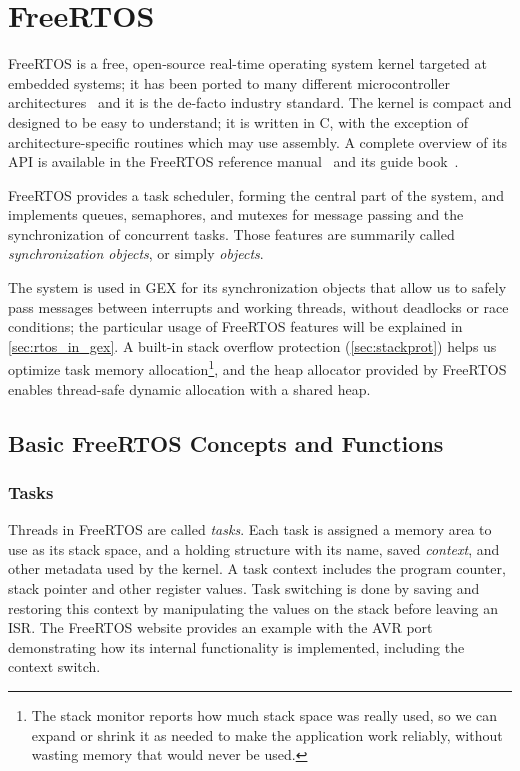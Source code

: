 \chapter{FreeRTOS} \label{sec:freertos}

FreeRTOS is a free, open-source real-time operating system kernel targeted at embedded systems; it has been ported to many different microcontroller architectures~\cite{freertos-ports-list} and it is the de-facto industry standard. The kernel is compact and designed to be easy to understand; it is written in C, with the exception of architecture-specific routines which may use assembly. A complete overview of its \gls{API} is available in the FreeRTOS reference manual~\cite{freertos-rm} and its guide book~\cite{freertos-book}.

FreeRTOS provides a task scheduler, forming the central part of the system, and implements queues, semaphores, and mutexes for message passing and the synchronization of concurrent tasks. Those features are summarily called \textit{synchronization objects}, or simply \textit{objects}.

The system is used in GEX for its synchronization objects that allow us to safely pass messages between interrupts and working threads, without deadlocks or race conditions; the particular usage of FreeRTOS features will be explained in \cref{sec:rtos_in_gex}. A built-in stack overflow protection (\cref{sec:stackprot}) helps us optimize task memory allocation\footnote{The stack monitor reports how much stack space was really used, so we can expand or shrink it as needed to make the application work reliably, without wasting memory that would never be used.}, and the heap allocator provided by FreeRTOS enables thread-safe dynamic allocation with a shared heap.

\section{Basic FreeRTOS Concepts and Functions}

\subsection{Tasks}

Threads in FreeRTOS are called \textit{tasks}. Each task is assigned a memory area to use as its stack space, and a holding structure with its name, saved \textit{context}, and other metadata used by the kernel. A task context includes the program counter, stack pointer and other register values. Task switching is done by saving and restoring this context by manipulating the values on the stack before leaving an \gls{ISR}. The FreeRTOS website provides an example with the AVR port~\cite{freertos-task-switching} demonstrating how its internal functionality is implemented, including the context switch.

